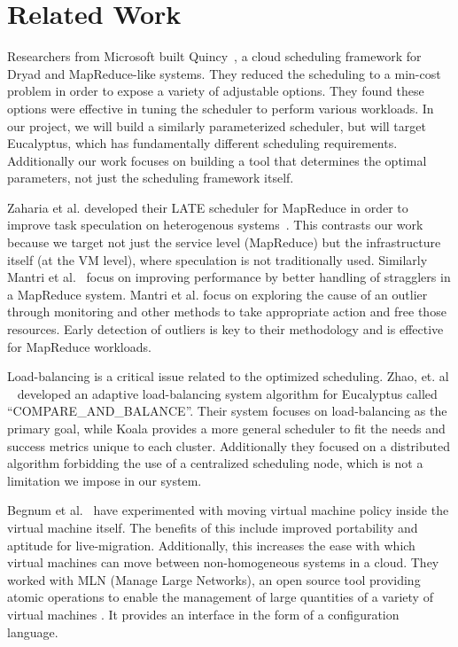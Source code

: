 \section{Related Work}
\label{sec:related}

Researchers from Microsoft built Quincy~\cite{Quincy}, a cloud scheduling
framework for Dryad and MapReduce-like systems.  They reduced the scheduling to
a min-cost problem in order to expose a variety of adjustable options.  They
found these options were effective in tuning the scheduler to perform various
workloads.  In our project, we will build a similarly parameterized scheduler,
but will target Eucalyptus, which has fundamentally different scheduling
requirements.  Additionally our work focuses on building a tool that determines
the optimal parameters, not just the scheduling framework itself.

Zaharia et al. developed their LATE scheduler for MapReduce in order to improve
task speculation on heterogenous systems~\cite{Zaharia}.  This contrasts our
work because we target not just the service level (MapReduce) but the
infrastructure itself (at the VM level), where speculation is not traditionally
used.  Similarly Mantri et al.~\cite{Mantri} focus on improving performance by
better handling of stragglers  in a MapReduce system.  Mantri et al. focus on
exploring the cause of an outlier through monitoring and other methods to take
appropriate action and free those resources.  Early detection of outliers is key
to their methodology and is effective for MapReduce workloads.

Load-balancing is a critical issue related to the optimized scheduling.  Zhao,
et. al ~\cite{Zhao} developed an adaptive load-balancing system algorithm for
Eucalyptus called ``COMPARE\_AND\_BALANCE''.  Their system focuses on
load-balancing as the primary goal, while Koala provides a more general
scheduler to fit the needs and success metrics unique to each cluster.
Additionally they focused on a distributed algorithm forbidding the use of a
centralized scheduling node, which is not a limitation we impose in our system.


Begnum et al.~\cite{Begnum} have experimented with moving virtual machine policy
inside the virtual machine itself.  The benefits of this include improved
portability and aptitude for live-migration.  Additionally, this increases the
ease with which virtual machines can move between non-homogeneous systems
in a cloud.  They worked with MLN (Manage Large Networks), an open source tool
providing atomic operations to enable the management of large quantities of a
variety of virtual machines \cite{Xen,UML,VMware}.  It provides an interface in
the form of a configuration language.

